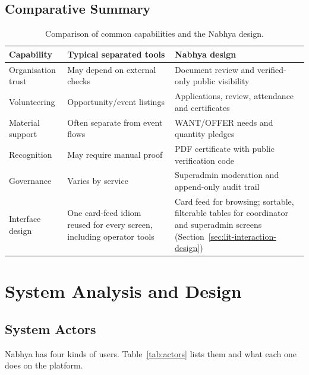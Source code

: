 \section{Comparative Summary}
\begin{table}[H]\centering
\caption{Comparison of common capabilities and the Nabhya design.}
\label{tab:comparison}
\begin{tabularx}{\textwidth}{|p{}|p{}|X|}
\hline
\textbf{Capability} & \textbf{Typical separated tools} & \textbf{Nabhya design}\\ \hline
Organisation trust & May depend on external checks & Document review and verified-only public visibility\\ \hline
Volunteering & Opportunity/event listings & Applications, review, attendance and certificates\\ \hline
Material support & Often separate from event flows & WANT/OFFER needs and quantity pledges\\ \hline
Recognition & May require manual proof & PDF certificate with public verification code\\ \hline
Governance & Varies by service & Superadmin moderation and append-only audit trail\\ \hline
Interface design & One card-feed idiom reused for every screen, including operator tools & Card feed for browsing; sortable, filterable tables for coordinator and superadmin screens (Section~\ref{sec:lit-interaction-design})\\ \hline
\end{tabularx}
\end{table}

\chapter{System Analysis and Design}
\label{ch:design}

\section{System Actors}
Nabhya has four kinds of users. Table~\ref{tab:actors} lists them and what each one does on the platform.

